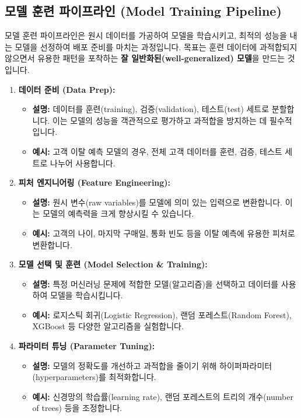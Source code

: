 \documentclass[11pt,a4paper]{article}
\theoremstyle{definition}
\begin{document}
\subsection{모델 훈련 파이프라인 (Model Training Pipeline)}

\begin{summarybox}
모델 훈련 파이프라인은 원시 데이터를 가공하여 모델을 학습시키고, 최적의 성능을 내는 모델을 선정하여 배포 준비를 마치는 과정입니다. 목표는 훈련 데이터에 과적합되지 않으면서 유용한 패턴을 포착하는 \textbf{잘 일반화된(well-generalized) 모델}을 만드는 것입니다.
\end{summarybox}

\begin{enumerate}
    \item \textbf{데이터 준비 (Data Prep):}
    \begin{itemize}
        \item \textbf{설명:} 데이터를 훈련(training), 검증(validation), 테스트(test) 세트로 분할합니다. 이는 모델의 성능을 객관적으로 평가하고 과적합을 방지하는 데 필수적입니다.
        \item \textbf{예시:} 고객 이탈 예측 모델의 경우, 전체 고객 데이터를 훈련, 검증, 테스트 세트로 나누어 사용합니다.
    \end{itemize}

    \item \textbf{피처 엔지니어링 (Feature Engineering):}
    \begin{itemize}
        \item \textbf{설명:} 원시 변수(raw variables)를 모델에 의미 있는 입력으로 변환합니다. 이는 모델의 예측력을 크게 향상시킬 수 있습니다.
        \item \textbf{예시:} 고객의 나이, 마지막 구매일, 통화 빈도 등을 이탈 예측에 유용한 피처로 변환합니다.
    \end{itemize}

    \item \textbf{모델 선택 및 훈련 (Model Selection \& Training):}
    \begin{itemize}
        \item \textbf{설명:} 특정 머신러닝 문제에 적합한 모델(알고리즘)을 선택하고 데이터를 사용하여 모델을 학습시킵니다.
        \item \textbf{예시:} 로지스틱 회귀(Logistic Regression), 랜덤 포레스트(Random Forest), XGBoost 등 다양한 알고리즘을 실험합니다.
    \end{itemize}

    \item \textbf{파라미터 튜닝 (Parameter Tuning):}
    \begin{itemize}
        \item \textbf{설명:} 모델의 정확도를 개선하고 과적합을 줄이기 위해 하이퍼파라미터(hyperparameters)를 최적화합니다.
        \item \textbf{예시:} 신경망의 학습률(learning rate), 랜덤 포레스트의 트리의 개수(number of trees) 등을 조정합니다.
    \end{itemize}


\end{enumerate}
\end{document}
